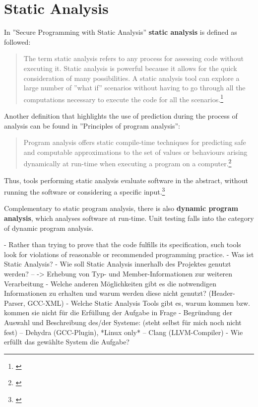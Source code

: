 \chapter{Static Analysis}

In ''Secure Programming with Static Analysis'' \textbf{static analysis} is defined as followed:

\begin{quotation}
The term static analysis refers to any process for assessing code without
executing it. Static analysis is powerful because it allows for the quick consideration of many possibilities. A static analysis tool can explore a large number of ''what if'' scenarios without having to go through all the computations
necessary to execute the code for all the scenarios.\footnote{\citep[3]{SecureProgramming}}
\end{quotation}

Another definition that highlights the use of prediction during the process of analysis can be found in ''Principles of program analysis'':

\begin{quotation}
Program analysis offers static compile-time techniques for predicting safe and computable approximations to the set of values or behaviours arising dynamically at run-time when executing a program on a computer.\footnote{\citep[1]{ProgramAnalysis}}
\end{quotation}

Thus, tools performing static analysis evaluate software in the abstract, without running the software or considering a specific input.\footnote{\citep{UsingSAToFindBugs}}

Complementary to static program analysis, there is also \textbf{dynamic program analysis}, which analyses software at run-time. Unit testing falls into the category of dynamic program analysis.




 - Rather than trying
to prove that the code fulfills its specification, such tools look for violations of reasonable or recommended programming practice.
 - Was ist Static Analysis?
 - Wie soll Static Analysis innerhalb des Projektes genutzt werden?
 -- -> Erhebung von Typ- und Member-Informationen zur weiteren Verarbeitung
 - Welche anderen Möglichkeiten gibt es die notwendigen Informationen zu erhalten und warum werden diese nicht genutzt? (Header-Parser, GCC-XML)
 - Welche Static Analysis Tools gibt es, warum kommen bzw. kommen sie nicht für die Erfüllung der Aufgabe in Frage
 - Begründung der Auswahl und Beschreibung des/der Systeme: (steht selbst für mich noch nicht fest)
 -- Dehydra (GCC-Plugin), *Linux only*
 -- Clang (LLVM-Compiler)
 - Wie erfüllt das gewählte System die Aufgabe?